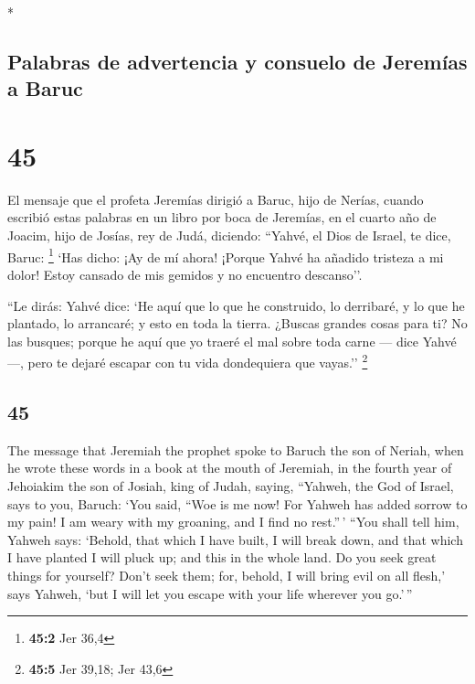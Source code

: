 \begin{paracol}{2}
\begin{otherlanguage}{english}
\end{otherlanguage}

\switchcolumn[0]*

\hypertarget{palabras-de-advertencia-y-consuelo-de-jeremuxedas-a-baruc}{%
\subsection{Palabras de advertencia y consuelo de Jeremías a
Baruc}\label{palabras-de-advertencia-y-consuelo-de-jeremuxedas-a-baruc}}

\hypertarget{section-88}{%
\section{45}\label{section-88}}

 El mensaje que el profeta Jeremías dirigió a Baruc, hijo
de Nerías, cuando escribió estas palabras en un libro por boca de
Jeremías, en el cuarto año de Joacim, hijo de Josías, rey de Judá,
diciendo:  ``Yahvé, el Dios de Israel, te dice, Baruc:
\footnote{\textbf{45:2} Jer 36,4}  `Has dicho: ¡Ay de mí
ahora! ¡Porque Yahvé ha añadido tristeza a mi dolor! Estoy cansado de
mis gemidos y no encuentro descanso''.

 ``Le dirás: Yahvé dice: `He aquí que lo que he
construido, lo derribaré, y lo que he plantado, lo arrancaré; y esto en
toda la tierra.  ¿Buscas grandes cosas para ti? No las
busques; porque he aquí que yo traeré el mal sobre toda carne --- dice
Yahvé ---, pero te dejaré escapar con tu vida dondequiera que vayas.''
\footnote{\textbf{45:5} Jer 39,18; Jer 43,6}

\switchcolumn
\begin{otherlanguage}{english}

\hypertarget{section-89}{%
\section{45}\label{section-89}}

 The message that Jeremiah the prophet spoke to Baruch the
son of Neriah, when he wrote these words in a book at the mouth of
Jeremiah, in the fourth year of Jehoiakim the son of Josiah, king of
Judah, saying,  ``Yahweh, the God of Israel, says to you,
Baruch:  `You said, ``Woe is me now! For Yahweh has added
sorrow to my pain! I am weary with my groaning, and I find no rest.''\,'
 ``You shall tell him, Yahweh says: `Behold, that which I
have built, I will break down, and that which I have planted I will
pluck up; and this in the whole land.  Do you seek great
things for yourself? Don't seek them; for, behold, I will bring evil on
all flesh,' says Yahweh, `but I will let you escape with your life
wherever you go.'\,''


\end{otherlanguage}
\end{paracol}
